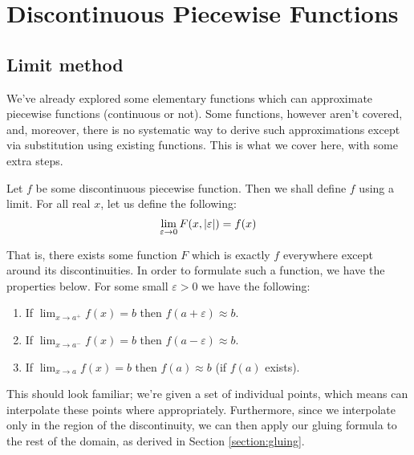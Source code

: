 \chapter{Discontinuous Piecewise Functions}
\section{Limit method}
We've already explored some elementary functions which can approximate piecewise functions (continuous or not). Some functions, however aren't covered, and, moreover, there is no systematic way to derive such approximations except via substitution using existing functions. This is what we cover here, with some extra steps.

Let $f$ be some discontinuous piecewise function. Then we shall define $f$ using a limit. For all real $x$, let us define the following:
$$
    \lim_{\varepsilon\to0}{F(x,\abs{\varepsilon})}=f(x)
$$

That is, there exists some function $F$ which is exactly $f$ everywhere except around its discontinuities. In order to formulate such a function, we have the properties below. For some small $\varepsilon>0$ we have the following:

\begin{enumerate}
    \item If $\lim_{x\to a^+}{f(x)}=b$ then $f(a+\varepsilon)\approx b$.
    \item If $\lim_{x\to a^-}{f(x)}=b$ then $f(a-\varepsilon)\approx b$.
    \item If $\lim_{x\to a}{f(x)}=b$ then $f(a)\approx b$ (if $f(a)$ exists).
\end{enumerate}

This should look familiar; we're given a set of individual points, which means can interpolate these points where appropriately. Furthermore, since we interpolate only in the region of the discontinuity, we can then apply our gluing formula to the rest of the domain, as derived in Section \ref{section:gluing}.


